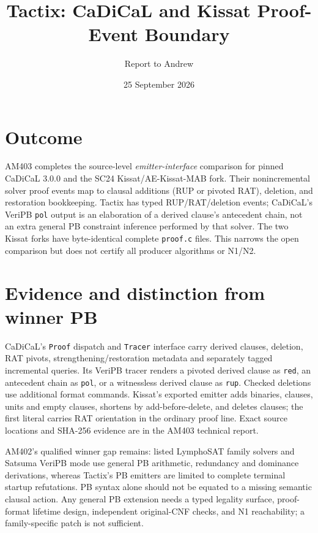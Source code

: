 \documentclass[11pt]{article}
\title{Tactix: CaDiCaL and Kissat Proof-Event Boundary}
\author{Report to Andrew}
\date{25 September 2026}
\newcommand{\code}[1]{\texttt{#1}}
\begin{document}
\maketitle
\vspace{-1.4em}

\section*{Outcome}
AM403 completes the source-level \emph{emitter-interface} comparison for pinned CaDiCaL 3.0.0 and the SC24 Kissat/AE-Kissat-MAB fork. Their nonincremental solver proof events map to clausal additions (RUP or pivoted RAT), deletion, and restoration bookkeeping. Tactix has typed RUP/RAT/deletion events; CaDiCaL's VeriPB \code{pol} output is an elaboration of a derived clause's antecedent chain, not an extra general PB constraint inference performed by that solver. The two Kissat forks have byte-identical complete \code{proof.c} files. This narrows the open comparison but does not certify all producer algorithms or N1/N2.

\section*{Evidence and distinction from winner PB}
CaDiCaL's \code{Proof} dispatch and \code{Tracer} interface carry derived clauses, deletion, RAT pivots, strengthening/restoration metadata and separately tagged incremental queries. Its VeriPB tracer renders a pivoted derived clause as \code{red}, an antecedent chain as \code{pol}, or a witnessless derived clause as \code{rup}. Checked deletions use additional format commands. Kissat's exported emitter adds binaries, clauses, units and empty clauses, shortens by add-before-delete, and deletes clauses; the first literal carries RAT orientation in the ordinary proof line. Exact source locations and SHA-256 evidence are in the AM403 technical report.

AM402's qualified winner gap remains: listed LymphoSAT family solvers and Satsuma VeriPB mode use general PB arithmetic, redundancy and dominance derivations, whereas Tactix's PB emitters are limited to complete terminal startup refutations. PB syntax alone should not be equated to a missing semantic clausal action. Any general PB extension needs a typed legality surface, proof-format lifetime design, independent original-CNF checks, and N1 reachability; a family-specific patch is not sufficient.
\end{document}

